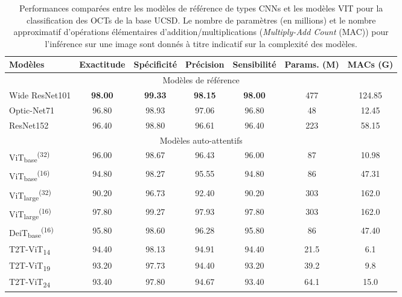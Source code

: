 \begin{table}[!h]
	\caption{Performances comparées entre les modèles de référence de types \ac{CNN}s et les modèles \ac{VIT} pour la classification des OCTs de la base UCSD. Le nombre de paramètres (en millions) et le nombre approximatif d'opérations élémentaires d'addition/multiplications (\textit{Multiply-Add Count} (MAC)) pour l'inférence sur une image sont donnés à titre indicatif sur la complexité des modèles.}\label{tab:CNN vs ViT-OCT}
	\centering
	\begin{tabularx}{\textwidth}{Xcccc||cc}
		\hline
		Modèles &  Exactitude & Spécificité &  Précision & Sensibilité & Params. (M) & MACs (G) \\ %
		\hline
		\multicolumn{7}{c}{Modèles de référence} \\
		\hline
		Wide ResNet101  & \textbf{98.00} & \textbf{99.33} & \textbf{98.15} & \textbf{98.00} & 477 & 124.85\\
		Optic-Net71  & 96.80 & 98.93 & 97.06 & 96.80 & 48 & 12.45 \\
		ResNet152 & 96.40 & 98.80 & 96.61 & 96.40 & 223 & 58.15 \\
		\hline
		\multicolumn{7}{c}{Modèles auto-attentifs} \\
		\hline
		ViT\textsubscript{base}\textsuperscript{(32)}  &96.00 & 98.67 & 96.43 & 96.00 & 87 & 10.98 \\
		ViT\textsubscript{base}\textsuperscript{(16)} &94.80 & 98.27 & 95.55 & 94.80 & 86 & 47.31 \\
		
		ViT\textsubscript{large}\textsuperscript{(32)} &90.20 & 96.73 & 92.40 & 90.20 & 303 & 162.0 \\
		
		ViT\textsubscript{large}\textsuperscript{(16)} &97.80 & 99.27 & 97.93 & 97.80 & 303 & 162.0 \\
		DeiT\textsubscript{base}\textsuperscript{(16)} &95.80 & 98.60 & 96.28 & 95.80 & 86 & 47.40 \\
		T2T-ViT\textsubscript{14} &94.40 & 98.13 & 94.91 & 94.40 & 21.5 & 6.1 \\
		T2T-ViT\textsubscript{19} &93.20 & 97.73 & 94.40 & 93.20 & 39.2 & 9.8 \\
		T2T-ViT\textsubscript{24} &93.40 & 97.80 & 94.67 & 93.40 & 64.1 & 15.0 \\
		\hline
	\end{tabularx}
\end{table}


